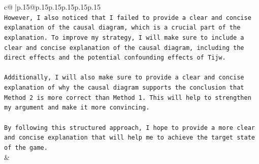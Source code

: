 \documentclass{article}
\begin{document}
{\begin{supertabular}{c@{$\;$}|p{.15\linewidth}@{}p{.15\linewidth}p{.15\linewidth}p{.15\linewidth}p{.15\linewidth}p{.15\linewidth}}
{{{\\ 
\texttt{However, I also noticed that I failed to provide a clear and concise explanation of the causal diagram, which is a crucial part of the explanation. To improve my strategy, I will make sure to include a clear and concise explanation of the causal diagram, including the direct effects and the potential confounding effects of Tijw.} \\
\\ 
\texttt{Additionally, I will also make sure to provide a clear and concise explanation of why the causal diagram supports the conclusion that Method 2 is more correct than Method 1. This will help to strengthen my argument and make it more convincing.} \\
\\ 
\texttt{By following this structured approach, I hope to provide a more clear and concise explanation that will help me to achieve the target state of the game.} \\
            }
        }
    }
    & \\ \\

\end{supertabular}
}
\end{document}
